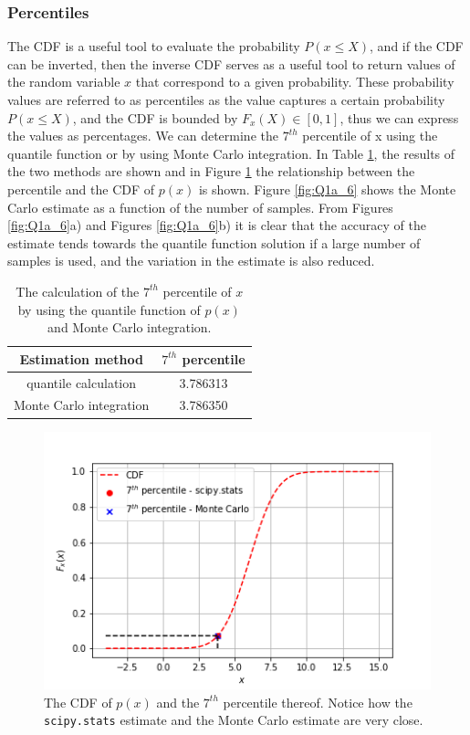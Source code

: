 \documentclass{article}
\begin{document}
\subsubsection{Percentiles}

The CDF is a useful tool to evaluate the probability $P(x \leq X)$, and if the CDF can be inverted, then the inverse CDF serves as a useful tool to return values of the random variable $x$ that correspond to a given probability. These probability values are referred to as percentiles as the value captures a certain probability $P(x \leq X)$, and the CDF is bounded by $F_x(X) \in [0, 1]$, thus we can express the values as percentages. We can determine the $7^{th}$ percentile of x using the quantile function or by using Monte Carlo integration. In Table \ref{tab:percentile_calculation}, the results of the two methods are shown and in Figure \ref{fig:Q1a_5} the relationship between the percentile and the CDF of $p(x)$ is shown. Figure \ref{fig:Q1a_6} shows the Monte Carlo estimate as a function of the number of samples. From Figures \ref{fig:Q1a_6}a) and Figures \ref{fig:Q1a_6}b) it is clear that the accuracy of the estimate tends towards the quantile function solution if a large number of samples is used, and the variation in the estimate is also reduced.
\begin{table}[!htb]
\centering
\caption{The calculation of the $7^{th}$ percentile of $x$ by using the quantile function of $p(x)$ and Monte Carlo integration.}
\label{tab:percentile_calculation}
\begin{tabular}{@{}cc@{}}
\toprule
Estimation method & $7^{th}$ percentile \\ \midrule
quantile calculation & 3.786313 \\
Monte Carlo integration & 3.786350 \\ \bottomrule
\end{tabular}
\end{table}
\begin{figure}
    \centering
    \includegraphics[scale=0.5]{Q1a_fig8.png}
    \caption{The CDF of $p(x)$ and the $7^{th}$ percentile thereof. Notice how the \texttt{scipy.stats} estimate and the Monte Carlo estimate are very close.}
    \label{fig:Q1a_5}
\end{figure}
\end{document}
